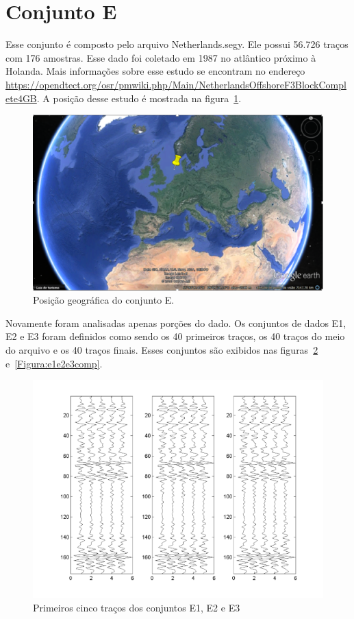\section{Conjunto E}

Esse conjunto é composto pelo arquivo Netherlands.segy. Ele possui 56.726 traços
com 176 amostras. Esse dado foi
coletado em 1987 no atlântico próximo à Holanda. Mais informações sobre esse
estudo se encontram no endereço
\url{https://opendtect.org/osr/pmwiki.php/Main/NetherlandsOffshoreF3BlockComplete4GB}.
A posição desse estudo é mostrada na figura~\ref{Figura:geograficamentefige}.

\begin{figure}[ht]
\centering
\includegraphics[scale=0.75]{fig/gps_img_e.png}
\caption[Posição do conjunto E]{Posição geográfica do conjunto E.}
\label{Figura:geograficamentefige}
\end{figure}

Novamente foram analisadas apenas porções do dado. Os conjuntos de
dados E1, E2 e E3 foram definidos como sendo os 40 primeiros traços, os 40
traços do meio do arquivo e os 40 traços finais. Esses conjuntos são exibidos
nas figuras~\ref{Figura:e1e2e3} e~\ref{Figura:e1e2e3comp}.

\begin{figure}[!h]
\centering
  \includegraphics[scale=1.01]{fig/fig_E1.png}
  \caption{Primeiros cinco traços dos conjuntos E1, E2 e E3}
  \label{Figura:e1e2e3}
\end{figure}

